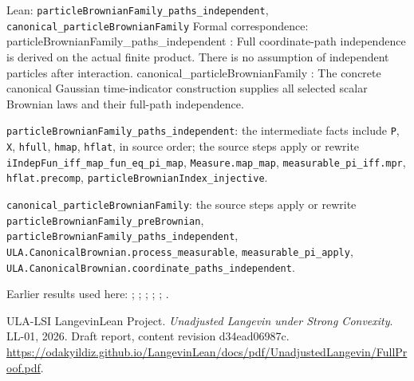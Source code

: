 \documentclass[11pt,a4paper]{article}
\begin{document}
\begin{leanbox}{Lean: \texttt{particleBrownianFamily\_\allowbreak{}paths\_\allowbreak{}independent}, \texttt{canonical\_\allowbreak{}particleBrownianFamily}}
Formal correspondence: particleBrownianFamily\_paths\_independent : Full coordinate-path independence is derived on the actual finite product. There is no assumption of independent particles after interaction. canonical\_particleBrownianFamily : The concrete canonical Gaussian time-indicator construction supplies all selected scalar Brownian laws and their full-path independence.



\texttt{particle\allowbreak{}Brownian\allowbreak{}Family\_\allowbreak{}paths\_\allowbreak{}independent}: the intermediate facts include \texttt{P}, \texttt{X}, \texttt{hfull}, \texttt{hmap}, \texttt{hflat}, in source order; the source steps apply or rewrite \texttt{i\allowbreak{}Indep\allowbreak{}Fun\_\allowbreak{}iff\_\allowbreak{}map\_\allowbreak{}fun\_\allowbreak{}eq\_\allowbreak{}pi\_\allowbreak{}map}, \texttt{Measure.\allowbreak{}map\_\allowbreak{}map}, \texttt{measurable\_\allowbreak{}pi\_\allowbreak{}iff.\allowbreak{}mpr}, \texttt{hflat.\allowbreak{}precomp}, \texttt{particle\allowbreak{}Brownian\allowbreak{}Index\_\allowbreak{}injective}.



\texttt{canonical\_\allowbreak{}particle\allowbreak{}Brownian\allowbreak{}Family}: the source steps apply or rewrite \texttt{particle\allowbreak{}Brownian\allowbreak{}Family\_\allowbreak{}pre\allowbreak{}Brownian}, \texttt{particle\allowbreak{}Brownian\allowbreak{}Family\_\allowbreak{}paths\_\allowbreak{}independent}, \texttt{ULA.\allowbreak{}Canonical\allowbreak{}Brownian.\allowbreak{}process\_\allowbreak{}measurable}, \texttt{measurable\_\allowbreak{}pi\_\allowbreak{}apply}, \texttt{ULA.\allowbreak{}Canonical\allowbreak{}Brownian.\allowbreak{}coordinate\_\allowbreak{}paths\_\allowbreak{}independent}.
\end{leanbox}


Earlier results used here: \cite[Section~3.8.11]{LangevinLean2026ULASC}; \cite[Section~3.8.16]{LangevinLean2026ULASC}; \cite[Section~3.8.17]{LangevinLean2026ULASC}; \cite[Section~3.8.19]{LangevinLean2026ULASC}; \cite[Section~3.8.20]{LangevinLean2026ULASC}; \cite[Section~3.8.21]{LangevinLean2026ULASC}.

\begin{thebibliography}{ULA-LSI}
LangevinLean Project. \emph{Unadjusted Langevin under Strong Convexity}. LL-01, 2026. Draft report, content revision d34ead06987c. \url{https://odakyildiz.github.io/LangevinLean/docs/pdf/UnadjustedLangevin/FullProof.pdf}.
\end{thebibliography}
\end{document}
